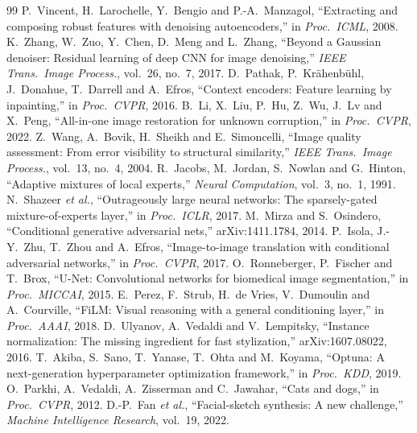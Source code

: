 \documentclass[journal,onecolumn,12pt,a4paper]{IEEEtran}
\begin{document}
\begin{thebibliography}{99}
 P.~Vincent, H.~Larochelle, Y.~Bengio and P.-A.~Manzagol, ``Extracting and composing robust features with denoising autoencoders,'' in \emph{Proc.\ ICML}, 2008.
 K.~Zhang, W.~Zuo, Y.~Chen, D.~Meng and L.~Zhang, ``Beyond a Gaussian denoiser: Residual learning of deep CNN for image denoising,'' \emph{IEEE Trans.\ Image Process.}, vol.~26, no.~7, 2017.
 D.~Pathak, P.~Kr\"ahenb\"uhl, J.~Donahue, T.~Darrell and A.~Efros, ``Context encoders: Feature learning by inpainting,'' in \emph{Proc.\ CVPR}, 2016.
 B.~Li, X.~Liu, P.~Hu, Z.~Wu, J.~Lv and X.~Peng, ``All-in-one image restoration for unknown corruption,'' in \emph{Proc.\ CVPR}, 2022.
 Z.~Wang, A.~Bovik, H.~Sheikh and E.~Simoncelli, ``Image quality assessment: From error visibility to structural similarity,'' \emph{IEEE Trans.\ Image Process.}, vol.~13, no.~4, 2004.
 R.~Jacobs, M.~Jordan, S.~Nowlan and G.~Hinton, ``Adaptive mixtures of local experts,'' \emph{Neural Computation}, vol.~3, no.~1, 1991.
 N.~Shazeer \emph{et al.}, ``Outrageously large neural networks: The sparsely-gated mixture-of-experts layer,'' in \emph{Proc.\ ICLR}, 2017.
 M.~Mirza and S.~Osindero, ``Conditional generative adversarial nets,'' arXiv:1411.1784, 2014.
 P.~Isola, J.-Y.~Zhu, T.~Zhou and A.~Efros, ``Image-to-image translation with conditional adversarial networks,'' in \emph{Proc.\ CVPR}, 2017.
 O.~Ronneberger, P.~Fischer and T.~Brox, ``U-Net: Convolutional networks for biomedical image segmentation,'' in \emph{Proc.\ MICCAI}, 2015.
 E.~Perez, F.~Strub, H.~de Vries, V.~Dumoulin and A.~Courville, ``FiLM: Visual reasoning with a general conditioning layer,'' in \emph{Proc.\ AAAI}, 2018.
 D.~Ulyanov, A.~Vedaldi and V.~Lempitsky, ``Instance normalization: The missing ingredient for fast stylization,'' arXiv:1607.08022, 2016.
 T.~Akiba, S.~Sano, T.~Yanase, T.~Ohta and M.~Koyama, ``Optuna: A next-generation hyperparameter optimization framework,'' in \emph{Proc.\ KDD}, 2019.
 O.~Parkhi, A.~Vedaldi, A.~Zisserman and C.~Jawahar, ``Cats and dogs,'' in \emph{Proc.\ CVPR}, 2012.
 D.-P.~Fan \emph{et al.}, ``Facial-sketch synthesis: A new challenge,'' \emph{Machine Intelligence Research}, vol.~19, 2022.
\end{thebibliography}
\end{document}
